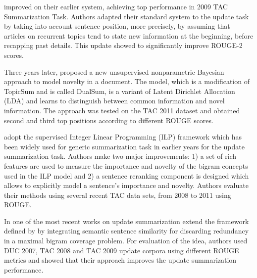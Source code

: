 \documentclass[11pt,a4paper,onecolumn]{article}
\begin{document}
\cite{gillick2009icsi} improved on their earlier system, achieving top performance in 2009 TAC Summarization Task.
Authors adapted their standard system to the update task by taking into account sentence position, more precisely, by assuming that articles on recurrent topics tend to state new information at the beginning, before recapping past details.
This update showed to significantly improve ROUGE-2 scores.

Three years later, \cite{delort2012dualsum} proposed a new unsupervised nonparametric Bayesian approach to model novelty in a document.
The model, which is a modification of TopicSum and is called DualSum, is a variant of Latent Dirichlet Allocation (LDA) and learns to distinguish between common information and novel information.
The approach was tested on the TAC 2011 dataset and obtained second and third top positions according to different ROUGE scores.

\cite{li2015improving} adopt the supervised Integer Linear Programming (ILP) framework which has been widely used for generic summarization task in earlier years \cite{martins2009summarization, woodsend2012multiple} for the update summarization task.
Authors make two major improvements: 1) a set of rich features are used to measure the importance and novelty of the bigram concepts used in the ILP model and 2) a sentence reranking component is designed which allows  to explicitly model a sentence’s importance and novelty.
Authors evaluate their methods using several recent TAC data sets, from 2008 to 2011 using ROUGE.

In one of the most recent works on update summarization \cite{de2017taking} extend the framework defined by \cite{gillick2009scalable} by integrating semantic sentence similarity for discarding redundancy in a maximal bigram coverage problem. 
For evaluation of the idea, authors used DUC 2007, TAC 2008 and TAC 2009 update corpora using different ROUGE metrics and showed that their approach improves the update summarization performance.
\end{document}
